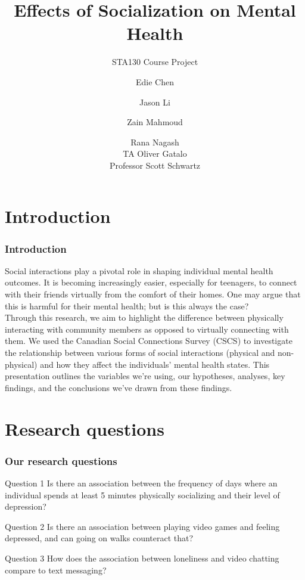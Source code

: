 \documentclass{beamer}
\title[Social Connections Analysis]
{Effects of Socialization on Mental Health}
\subtitle{STA130 Course Project}
\author[STA130] %
{Edie Chen \and Jason Li \and Zain Mahmoud \and Rana Nagash\\
TA Oliver Gatalo\\
Professor Scott Schwartz}
\institute[UofT] %
{
  STA130: An Introduction to Statistical Reasoning and Data Science\\
  Department of Statistical Sciences\\
  University of Toronto
}
\date[November 2024] %
\begin{document}
\frame{\titlepage}


\section{Introduction}

\begin{frame}
\frametitle{Introduction}
Social interactions play a pivotal role in shaping individual mental health outcomes. It is becoming increasingly easier, especially for teenagers, to connect with their friends virtually from the comfort of their homes. One may argue that this is harmful for their mental health; but is this always the case?\\
Through this research, we aim to highlight the difference between physically interacting with community members as opposed to virtually connecting with them. We used the \alert{Canadian Social Connections Survey (CSCS)} to investigate the relationship between various forms of social interactions (physical and non-physical) and how they affect the individuals' mental health states. 
This presentation outlines the variables we're using, our hypotheses, analyses, key findings, and the conclusions we've drawn from these findings.
\end{frame}


\section{Research questions}

\begin{frame}
\frametitle{Our research questions}

\begin{block}{Question 1}
    Is there an association between the frequency of days where an individual spends at least 5 minutes physically socializing and their level of depression?
\end{block}

\begin{block}{Question 2}
Is there an association between playing video games and feeling depressed, and can going on walks counteract that?
\end{block}

\begin{block}{Question 3}
    How does the association between loneliness and video chatting compare to text messaging?
\end{block}
\end{frame}
\end{document}
